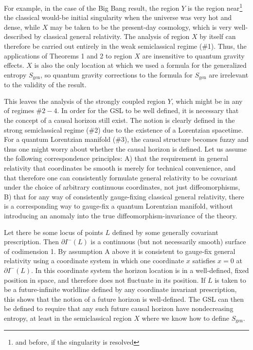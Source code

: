 \documentclass[12pt]{article}
\begin{document}
For example, in the case of the Big Bang result, the region $Y$ is the region near\footnote{and before, if the singularity is resolved} the classical would-be initial singularity when the universe was very hot and dense, while $X$ may be taken to be the present-day cosmology, which is very well-described by classical general relativity.  The analysis of region $X$ by itself can therefore be carried out entirely in the weak semiclassical regime (\#1).  Thus, the applications of Theorems 1 and 2 to region $X$ are insensitive to quantum gravity effects.  $X$ is also the only location at which we used a formula for the generalized entropy $S_\mathrm{gen}$, so quantum gravity corrections to the formula for $S_\mathrm{gen}$ are irrelevant to the validity of the result.

This leaves the analysis of the strongly coupled region $Y$, which might be in any of regimes $\#2-4$.  In order for the GSL to be well defined, it is necessary that the concept of a causal horizon still exist.  The notion is clearly defined in the strong semiclassical regime (\#2) due to the existence of a Lorentzian spacetime.  For a quantum Lorentzian manifold (\#3), the causal structure becomes fuzzy and thus one might worry about whether the causal horizon is defined.  Let us assume the following correspondence principles: A) that the requirement in general relativity that coordinates be smooth is merely for technical convenience, and that therefore one can consistently formulate general relativity to be covariant under the choice of arbitrary continuous coordinates, not just diffeomorphisms, B) that for any way of consistently gauge-fixing classical general relativity, there is a corresponding way to gauge-fix a quantum Lorentzian manifold, without introducing an anomaly into the true diffeomorphism-invariance of the theory.

Let there be some locus of points $L$ defined by some generally covariant prescription.  Then $\partial I^-(L)$ is a continuous (but not necessarily smooth) surface of codimension 1.  By assumption A above it is consistent to gauge-fix general relativity using a coordinate system in which one coordinate $x$ satisfies $x = 0$ at $\partial I^-(L)$.  In this coordinate system the horizon location is in a well-defined, fixed position in space, and therefore does not fluctuate in its position.  If $L$ is taken to be a future-infinite worldline defined by any coordinate invariant prescription, this shows that the notion of a future horizon is well-defined.  The GSL can then be defined to require that any such future causal horizon have nondecreasing entropy, at least in the semiclassical region $X$ where we know how to define $S_\mathrm{gen}$.
\end{document}
